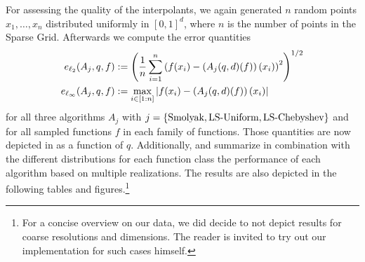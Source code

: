 \documentclass[12pt, oneside]{amsart}
\theoremstyle{definition}
\theoremstyle{remark}
\numberwithin{equation}{section}
\begin{document}
For assessing the quality of the interpolants, we again generated $n$ random points 
$x_1, \ldots, x_n$ distributed uniformly in $[0,1]^d$, where $n$ is the number 
of points in the Sparse Grid. Afterwards we compute the error quantities
\begin{align*} 
	e_{\ell_2}(A_j,q,f) &:= \left(\frac{1}{n}\sum_{i=1}^{n}
	\left(f(x_i)-\left(A_j(q,d)(f)\right)(x_i)\right)^2\right)^{1/2}\\
	e_{\ell_\infty}(A_j,q,f) &:= \max_{i\in[1:n]} 
	\left \vert f(x_i)-\left(A_j(q,d)(f)\right)(x_i) \right \vert
\end{align*}
for all three algorithms $A_j$ with $j=\left\{\text{Smolyak}, \text{LS-Uniform}, 
\text{LS-Chebyshev}\right\}$ and for all sampled functions $f$ in each family of 
functions. Those quantities are now depicted in 
 as a function of $q$. 
Additionally,  and  summarize in combination with 
the different distributions for each function class 
 the performance of each algorithm based on multiple realizations. 
The results are also depicted in the following tables and figures.\footnote{For a concise overview on our data, we did decide to not depict results for coarse resolutions and dimensions. The reader is invited to try out our implementation for such cases himself.}




\newpage


\end{document}
